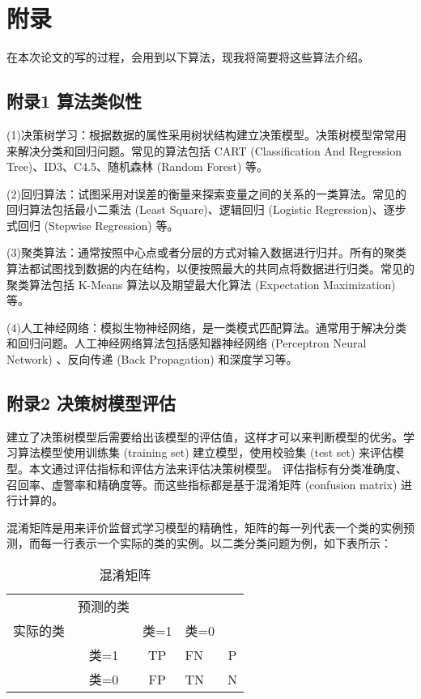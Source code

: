 \section*{附录}
在本次论文的写的过程，会用到以下算法，现我将简要将这些算法介绍。

\subsection*{附录1  算法类似性}

(1)决策树学习：根据数据的属性采用树状结构建立决策模型。决策树模型常常用来解决分类和回归问题。常见的算法包括 CART (Classification And Regression Tree)、ID3、C4.5、随机森林 (Random Forest) 等。

(2)回归算法：试图采用对误差的衡量来探索变量之间的关系的一类算法。常见的回归算法包括最小二乘法 (Least Square)、逻辑回归 (Logistic Regression)、逐步式回归 (Stepwise Regression) 等。

(3)聚类算法：通常按照中心点或者分层的方式对输入数据进行归并。所有的聚类算法都试图找到数据的内在结构，以便按照最大的共同点将数据进行归类。常见的聚类算法包括 K-Means 算法以及期望最大化算法 (Expectation Maximization) 等。

(4)人工神经网络：模拟生物神经网络，是一类模式匹配算法。通常用于解决分类和回归问题。人工神经网络算法包括感知器神经网络 (Perceptron Neural Network) 、反向传递 (Back Propagation) 和深度学习等。

\newpage

\subsection*{附录2   决策树模型评估}

建立了决策树模型后需要给出该模型的评估值，这样才可以来判断模型的优劣。学习算法模型使用训练集 (training set) 建立模型，使用校验集 (test set) 来评估模型。本文通过评估指标和评估方法来评估决策树模型。 评估指标有分类准确度、召回率、虚警率和精确度等。而这些指标都是基于混淆矩阵 (confusion matrix) 进行计算的。

混淆矩阵是用来评价监督式学习模型的精确性，矩阵的每一列代表一个类的实例预测，而每一行表示一个实际的类的实例。以二类分类问题为例，如下表所示：

\begin{table}[thbp]\footnotesize
	\caption{混淆矩阵}
	\begin{center}
		\begin{tabular}{cc|clc}
			\hline	&预测的类\\
			  实际的类& & 类=1 & 类=0  \\
			\hline &类=1 & TP & FN &P\\ 	
			\hline &类=0 & FP & TN&N \\
			\hline
		\end{tabular}
	\end{center}
\end{table}


